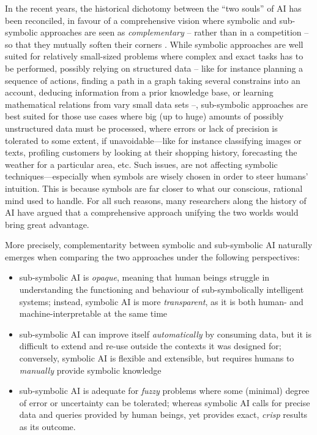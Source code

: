\documentclass[12pt,a4paper,openright,twoside]{book}
\begin{document}
In the recent years, the historical dichotomy between the ``two souls'' of AI has been reconciled, in favour of a comprehensive vision where symbolic and sub-symbolic approaches are seen as \emph{complementary} -- rather than in a competition -- so that they mutually soften their corners \cite{Hoehndorf2017, xailp-woa2019, lpaas-bdcc2}.
%
While symbolic approaches are well suited for relatively small-sized problems where complex and exact tasks has to be performed, possibly relying on structured data -- like for instance planning a sequence of actions, finding a path in a graph taking several constrains into an account, deducing information from a prior knowledge base, or learning mathematical relations from vary small data sets --, sub-symbolic approaches are best suited for those use cases where big (up to huge) amounts of possibly unstructured data  must be processed, where errors or lack of precision is tolerated to some extent, if unavoidable---like for instance classifying images or texts, profiling customers by looking at their shopping history, forecasting the weather for a particular area, etc.
%
Such issues, are not affecting symbolic techniques---especially when symbols are wisely chosen in order to steer humans' intuition.
%
This is because symbols are far closer to what our conscious, rational mind used to handle.
%
For all such reasons, many researchers along the history of AI have argued that a comprehensive approach unifying the two worlds would bring great advantage.

More precisely, complementarity between symbolic and sub-symbolic AI naturally emerges when comparing the two approaches under the following perspectives:
%
\begin{itemize}
    \item sub-symbolic AI is \emph{opaque}, meaning that human beings struggle in understanding the functioning and behaviour of sub-symbolically intelligent systems; instead, symbolic AI is more \emph{transparent}, as it is both human- and machine-interpretable at the same time
    \item sub-symbolic AI can improve itself \emph{automatically} by consuming data, but it is difficult to extend and re-use outside the contexts it was designed for; conversely, symbolic AI is flexible and extensible, but requires humans to \emph{manually} provide symbolic knowledge
    \item sub-symbolic AI is adequate for \emph{fuzzy} problems where some (minimal) degree of error or uncertainty can be tolerated; whereas symbolic AI calls for precise data and queries provided by human beings, yet provides exact, \emph{crisp} results as its outcome.
\end{itemize}
\end{document}
